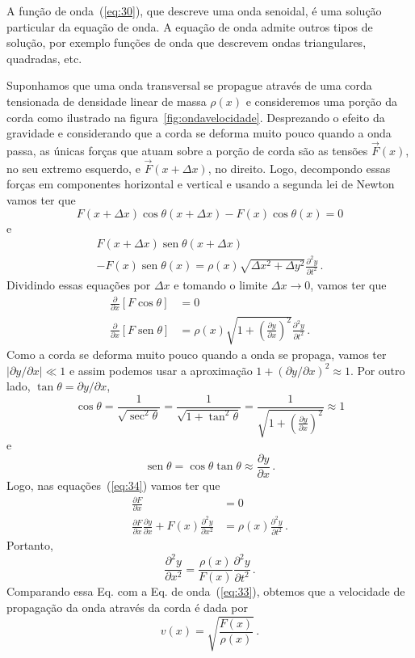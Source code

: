 \documentclass[twocolumn=on,fontsize=12pt,DIV=calc]{scrartcl}
\newcommand{\dpar}[1]{\left(#1\right)}
\theoremstyle{definition}
\DeclareMathOperator{\sen}{sen}
\begin{document}
A função de onda~(\ref{eq:30}), que descreve uma onda senoidal, é uma
solução particular da equação de onda. A equação de onda admite outros
tipos de solução, por exemplo funções de onda que descrevem ondas
triangulares, quadradas, etc.

Suponhamos que uma onda transversal se propague através de uma corda
tensionada de densidade linear de massa $\rho(x)$ e consideremos uma
porção da corda como ilustrado na
figura~\ref{fig:ondavelocidade}. Desprezando o efeito da gravidade e
considerando que a corda se deforma muito pouco quando a onda passa,
as únicas forças que atuam sobre a porção de corda são as tensões
$\vec F(x)$, no seu extremo esquerdo, e $\vec F(x+\Delta x)$, no
direito. Logo, decompondo essas forças em componentes horizontal e
vertical e usando a segunda lei de Newton vamos ter que
$$F(x+\Delta x)\cos\theta(x+\Delta x)-F(x)\cos\theta(x)=0$$
e
\begin{multline*}
  F(x+\Delta x)\sen\theta(x+\Delta x)\\
  -F(x)\sen\theta(x)=\rho(x)\sqrt{\Delta x^2+\Delta
    y^2}\frac{\partial^2 y}{\partial t^2}\,.
\end{multline*}
Dividindo essas equações por $\Delta x$ e tomando o limite
$\Delta x\to 0$, vamos ter que
\begin{equation}
  \label{eq:34}
  \begin{split}
    \frac{\partial}{\partial x}[F\cos\theta]&=0\\
    \frac{\partial}{\partial
      x}[F\sen\theta]&=\rho(x)\sqrt{1+\dpar{\frac{\partial y}{\partial
          x}}^2}\frac{\partial^2 y}{\partial t^2}\,.
  \end{split}
\end{equation}
Como a corda se deforma muito pouco quando a onda se propaga, vamos
ter $|\partial y/\partial x|\ll 1$ e assim podemos usar a aproximação
$1+(\partial y/\partial x)^2\approx 1$. Por outro lado,
$\tan\theta=\partial y/\partial x$,
$$\cos\theta=\frac{1}{\sqrt{\sec^2\theta}}=\frac{1}{\sqrt{1+\tan^2\theta}}=\frac{1}{\sqrt{1+(\frac{\partial y}{\partial x})^2}}\approx 1$$
e
$$\sen\theta=\cos\theta\tan\theta\approx \frac{\partial y}{\partial x}\,.$$
Logo, nas equações~(\ref{eq:34}) vamos ter que
\begin{equation*}
  \begin{split}
    \frac{\partial F}{\partial x}&=0\\
    \frac{\partial F}{\partial x}\frac{\partial y}{\partial
      x}+F(x)\frac{\partial^2 y}{\partial
      x^2}&=\rho(x)\frac{\partial^2 y}{\partial t^2}\,.
  \end{split}
\end{equation*}
Portanto,
$$\frac{\partial^2 y}{\partial x^2}=\frac{\rho(x)}{F(x)}\frac{\partial^2 y}{\partial t^2}\,.$$
Comparando essa Eq. com a Eq. de onda~(\ref{eq:33}), obtemos que a
velocidade de propagação da onda através da corda é dada por
$$v(x)=\sqrt{\frac{F(x)}{\rho(x)}}\,.$$
\end{document}
